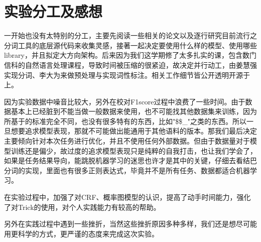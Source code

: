\section{实验分工及感想}
\label{sec:conclusion}

一开始也没有太特别的分工，主要先阅读一些相关的论文以及逐行研究目前流行之分词工具的底层源代码来收集灵感，接著一起决定要使用什么样的模型、使用哪些 library，并且拟定大方向架构。后来因为我们这学期修了太多扎实的课，包含数门信科的自然语言处理课程，导致时间被压缩的很紧迫，故决定并行动工，由姜慧强实现分词、李大为来做预处理与实现词性标注。相关工作细节皆公开透明开源于  上。

因为实验数据中噪音比较大，另外在校对F1score过程中浪费了一些时间。由于数据基本上已经脏到不能当做一般数据来使用，也不可能找其他数据集来训练，因为所基于的标准完全不同，也没有很多特有的东西，比如"\$\$\_"之类的东西。所以一旦想要追求模型表现，那就不可能做出能通用于其他语料的版本。那我们最后决定主要倾向针对本次任务进行优化，并且不使用任何外部数据。但由于数据量对于模型训练还是偏少，故过度的追求模型表现只是纯粹的自我打击，也让我们学会了，如果是任务结果导向，能跳脱机器学习的迷思也许才是其中的关键，仔细去看结巴分词的实现，里面也有很多正则表达式，毕竟并不是所有任务、数据都适合机器学习。

在实验过程中，加强了对CRF、概率图模型的认识，提高了动手时间能力，强化了对Trick的使用，对个人实践能力有较高的帮助。

另外在实践过程中遇到一些挫折，当然这些挫折原因多种多样，我们还是想尽可能用更科学的方式，更严谨的态度来完成这次实验。